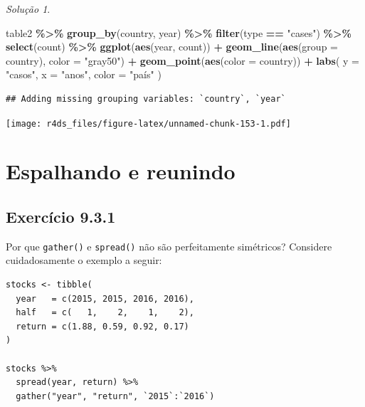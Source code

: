 \documentclass[
]{latex/krantz}
\newenvironment{Shaded}{\begin{snugshade}}{\end{snugshade}}
\newcommand{\AttributeTok}[1]{\textcolor[rgb]{0.13,0.29,0.53}{#1}}
\newcommand{\FunctionTok}[1]{\textcolor[rgb]{0.13,0.29,0.53}{\textbf{#1}}}
\newcommand{\NormalTok}[1]{#1}
\newcommand{\SpecialCharTok}[1]{\textcolor[rgb]{0.81,0.36,0.00}{\textbf{#1}}}
\newcommand{\StringTok}[1]{\textcolor[rgb]{0.31,0.60,0.02}{#1}}
\theoremstyle{definition}
\theoremstyle{definition}
\theoremstyle{definition}
\theoremstyle{definition}
\theoremstyle{remark}
\newtheorem*{solution}{Solução}
\begin{document}
\begin{solution}
\leavevmode

\begin{Shaded}
\begin{Highlighting}[]
\NormalTok{table2 }\SpecialCharTok{\%\textgreater{}\%}
  \FunctionTok{group\_by}\NormalTok{(country, year) }\SpecialCharTok{\%\textgreater{}\%}
  \FunctionTok{filter}\NormalTok{(type }\SpecialCharTok{==} \StringTok{"cases"}\NormalTok{) }\SpecialCharTok{\%\textgreater{}\%}
  \FunctionTok{select}\NormalTok{(count) }\SpecialCharTok{\%\textgreater{}\%}
  \FunctionTok{ggplot}\NormalTok{(}\FunctionTok{aes}\NormalTok{(year, count)) }\SpecialCharTok{+}
    \FunctionTok{geom\_line}\NormalTok{(}\FunctionTok{aes}\NormalTok{(}\AttributeTok{group =}\NormalTok{ country), }\AttributeTok{color =} \StringTok{"gray50"}\NormalTok{) }\SpecialCharTok{+}
    \FunctionTok{geom\_point}\NormalTok{(}\FunctionTok{aes}\NormalTok{(}\AttributeTok{color =}\NormalTok{ country)) }\SpecialCharTok{+}
    \FunctionTok{labs}\NormalTok{(}
      \AttributeTok{y =} \StringTok{"casos"}\NormalTok{,}
      \AttributeTok{x =} \StringTok{"anos"}\NormalTok{,}
      \AttributeTok{color =} \StringTok{"país"}
\NormalTok{    )}
\end{Highlighting}
\end{Shaded}

\begin{verbatim}
## Adding missing grouping variables: `country`, `year`
\end{verbatim}

\texttt{[image: r4ds\_files/figure-latex/unnamed-chunk-153-1.pdf]}

\end{solution}

\hypertarget{espalhando-e-reunindo}{%
\section{Espalhando e reunindo}\label{espalhando-e-reunindo}}

\hypertarget{exr9-3-1}{%
\subsection*{Exercício 9.3.1}\label{exr9-3-1}}

Por que \texttt{gather()} e \texttt{spread()} não são perfeitamente simétricos? Considere cuidadosamente o exemplo a seguir:

\begin{verbatim}
stocks <- tibble(
  year   = c(2015, 2015, 2016, 2016),
  half   = c(   1,    2,    1,    2),
  return = c(1.88, 0.59, 0.92, 0.17)
)

stocks %>%
  spread(year, return) %>%
  gather("year", "return", `2015`:`2016`)
\end{verbatim}
\end{document}
